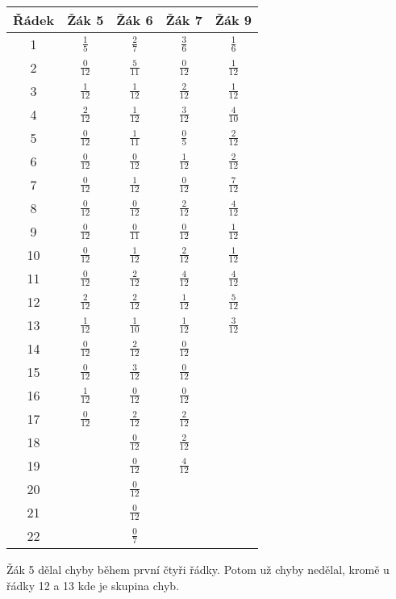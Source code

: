 \begin{tabular}[hb]{|c|c|c|c|c|}
\hline
Řádek&Žák 5&Žák 6&Žák 7&Žák 9\\
\hline
1&$\frac{1}{5}$&$\frac{2}{7}$&$\frac{3}{6}$&$\frac{1}{6}$\\
\hline
2&$\frac{0}{12}$&$\frac{5}{11}$&$\frac{0}{12}$&$\frac{1}{12}$\\
\hline
3&$\frac{1}{12}$&$\frac{1}{12}$&$\frac{2}{12}$&$\frac{1}{12}$\\
\hline
4&$\frac{2}{12}$&$\frac{1}{12}$&$\frac{3}{12}$&$\frac{4}{10}$\\
\hline
5&$\frac{0}{12}$&$\frac{1}{11}$&$\frac{0}{5}$&$\frac{2}{12}$\\
\hline
6&$\frac{0}{12}$&$\frac{0}{12}$&$\frac{1}{12}$&$\frac{2}{12}$\\
\hline
7&$\frac{0}{12}$&$\frac{1}{12}$&$\frac{0}{12}$&$\frac{7}{12}$\\
\hline
8&$\frac{0}{12}$&$\frac{0}{12}$&$\frac{2}{12}$&$\frac{4}{12}$\\
\hline
9&$\frac{0}{12}$&$\frac{0}{11}$&$\frac{0}{12}$&$\frac{1}{12}$\\
\hline
10&$\frac{0}{12}$&$\frac{1}{12}$&$\frac{2}{12}$&$\frac{1}{12}$\\
\hline
11&$\frac{0}{12}$&$\frac{2}{12}$&$\frac{4}{12}$&$\frac{4}{12}$\\
\hline
12&$\frac{2}{12}$&$\frac{2}{12}$&$\frac{1}{12}$&$\frac{5}{12}$\\
\hline
13&$\frac{1}{12}$&$\frac{1}{10}$&$\frac{1}{12}$&$\frac{3}{12}$\\
\hline
14&$\frac{0}{12}$&$\frac{2}{12}$&$\frac{0}{12}$&\\
\hline
15&$\frac{0}{12}$&$\frac{3}{12}$&$\frac{0}{12}$&\\
\hline
16&$\frac{1}{12}$&$\frac{0}{12}$&$\frac{0}{12}$&\\
\hline
17&$\frac{0}{12}$&$\frac{2}{12}$&$\frac{2}{12}$&\\
\hline
18&&$\frac{0}{12}$&$\frac{2}{12}$&\\
\hline
19&&$\frac{0}{12}$&$\frac{4}{12}$&\\
\hline
20&&$\frac{0}{12}$&&\\
\hline
21&&$\frac{0}{12}$&&\\
\hline
22&&$\frac{0}{7}$&&\\
\hline
\end{tabular}

Žák 5 dělal chyby během první čtyři řádky.  Potom už chyby nedělal, kromě u řádky 12 a 13 kde je skupina chyb.

